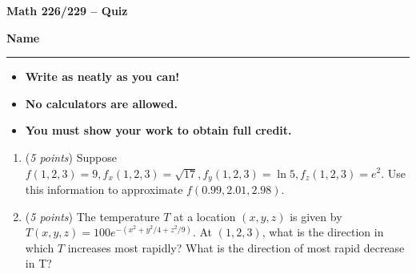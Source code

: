 \documentclass[12 pt]{article}
\begin{document}
  \begin{center}
    \textbf{\hfill Math 226/229 -- Quiz} \\
  \end{center}
  \medskip

  \noindent
  \textbf{Name}\ \rule{3.5in}{.4pt} \hfill
  \vspace{.1in}
  \hspace*{0.2in}
  \begin{itemize}
    \item \textbf{Write as neatly as you can!}
    \item \textbf{No calculators are allowed.}
    \item \textbf{You must show your work to obtain full credit.}
  \end{itemize}

	\medskip
  \noindent

  \begin{enumerate}
    \item (\textit{5 points})
    Suppose $f(1,2,3)=9, f_x(1,2,3)=\sqrt{17}, f_y(1,2,3) = \ln 5, f_z(1,2,3) = e^2$. Use this information to approximate $f(0.99, 2.01, 2.98)$.
		\vspace{2in}
		\item (\textit{5 points})
		The temperature $T$ at a location $(x, y, z)$ is given by $T(x,y,z) = 100e^{-(x^2+y^2/4+z^2/9)}$. At $(1,2,3)$, what is the direction in which $T$ increases most rapidly? What is the direction of most rapid decrease in T?
  \end{enumerate}
\end{document}
